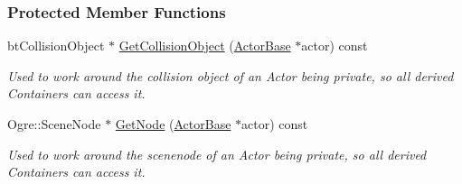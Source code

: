 \subsubsection*{Protected Member Functions}
\begin{DoxyCompactItemize}
\item 
\hypertarget{classMezzanine_1_1ActorContainerBase_a591b8ce55aab6bc6ff7d10085f582baa}{
btCollisionObject $\ast$ \hyperlink{classMezzanine_1_1ActorContainerBase_a591b8ce55aab6bc6ff7d10085f582baa}{GetCollisionObject} (\hyperlink{classMezzanine_1_1ActorBase}{ActorBase} $\ast$actor) const }
\label{classMezzanine_1_1ActorContainerBase_a591b8ce55aab6bc6ff7d10085f582baa}

\begin{DoxyCompactList}\small\item\em Used to work around the collision object of an Actor being private, so all derived Containers can access it. \item\end{DoxyCompactList}\item 
\hypertarget{classMezzanine_1_1ActorContainerBase_aa368146bb82e3384240b769f64b3a6fe}{
Ogre::SceneNode $\ast$ \hyperlink{classMezzanine_1_1ActorContainerBase_aa368146bb82e3384240b769f64b3a6fe}{GetNode} (\hyperlink{classMezzanine_1_1ActorBase}{ActorBase} $\ast$actor) const }
\label{classMezzanine_1_1ActorContainerBase_aa368146bb82e3384240b769f64b3a6fe}

\begin{DoxyCompactList}\small\item\em Used to work around the scenenode of an Actor being private, so all derived Containers can access it. \item\end{DoxyCompactList}\end{DoxyCompactItemize}


